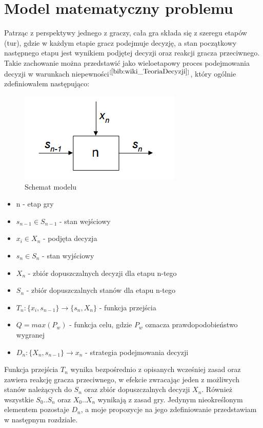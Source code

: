 \section{Model matematyczny problemu}
Patrząc z perspektywy jednego z graczy, cała gra składa się z szeregu etapów (tur), gdzie w każdym etapie gracz podejmuje decyzję, a stan początkowy następnego etapu jest wynikiem podjętej decyzji oraz reakcji gracza przeciwnego. Takie zachowanie można przedstawić jako wieloetapowy proces podejmowania decyzji w warunkach niepewności$^{[\ref{bib:wiki_TeoriaDecyzji}]}$, który ogólnie zdefiniowałem następująco: 

\clearpage
\begin{figure}[h]  %
	\centering
	\includegraphics[]{Resources/Schemat_Modelu.png}
	\caption{Schemat modelu} \label{fig:Schemat_Modelu}
\end{figure}
\begin{itemize}
	\item n - etap gry
	\item $s_{n-1} \in S_{n-1}$ - stan wejściowy
	\item $x_i \in X_n$ - podjęta decyzja
	\item $s_{n} \in S_n$ - stan wyjściowy
	\item $X_n$ - zbiór dopuszczalnych decyzji dla etapu n-tego
	\item $S_n$ - zbiór dopuszczalnych stanów dla etapu n-tego
	\item $T_n: \{x_i, s_{n-1} \} \rightarrow \{s_n, X_n\}$ - funkcja przejścia
	\item $Q = max(P_w)$ - funkcja celu, gdzie $P_w$ oznacza prawdopodobieństwo wygranej
	\item $D_n: \{X_n, s_{n-1}\} \rightarrow x_n$ - strategia podejmowania decyzji
\end{itemize}
Funkcja przejścia $T_n$ wynika bezpośrednio z opisanych wcześniej zasad oraz zawiera reakcję gracza przeciwnego, w efekcie zwracając jeden z możliwych stanów należących do $S_n$ oraz zbiór dopuszczalnych decyzji $X_n$. Również wszystkie $S_0 .. S_n$ oraz $X_0 .. X_n$ wynikają z zasad gry. Jedynym nieokreślonym elementem pozostaje $D_n$, a moje propozycje na jego zdefiniowanie przedstawiam w następnym rozdziale.